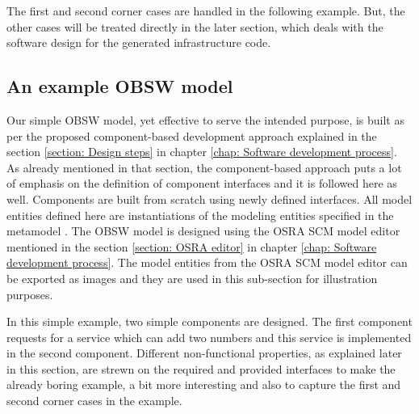 The first and second corner cases are handled in the following example. But, the other cases will be treated directly in the later section, which deals with the software design for the generated infrastructure code. 

\subsection{An example OBSW model}
Our simple OBSW model, yet effective to serve the intended purpose, is built as per the proposed component-based development approach explained in the section \cref{section: Design steps} in chapter \cref{chap: Software development process}. As already mentioned in that section, the component-based approach puts a lot of emphasis on the definition of component interfaces \cite{CompBasedProcess} and it is followed here as well. Components are built from scratch using newly defined interfaces. All model entities defined here are instantiations of the modeling entities specified in the metamodel \cite{SpecMetamodel}. The OBSW model is designed using the OSRA SCM model editor mentioned in the section \cref{section: OSRA editor} in chapter \cref{chap: Software development process}. The model entities from the OSRA SCM model editor can be exported as images and they are used in this sub-section for illustration purposes.

In this simple example, two simple components are designed. The first component requests for a service which can add two numbers and this service is implemented in the second component. Different non-functional properties, as explained later in this section, are strewn on the required and provided interfaces to make the already boring example, a bit more interesting and also to capture the first and second corner cases in the example.

